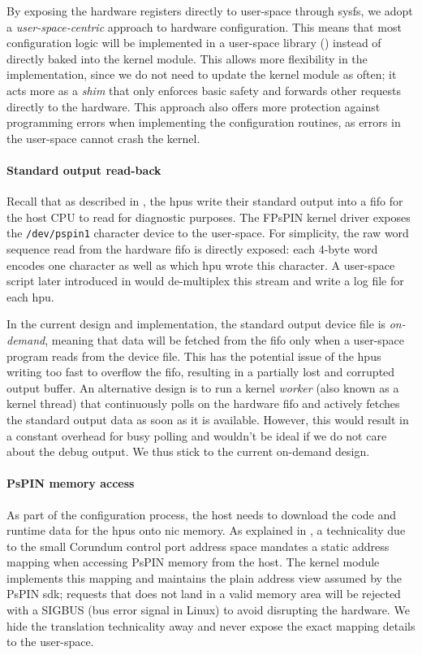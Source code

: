By exposing the hardware registers directly to user-space through sysfs, we adopt a \emph{user-space-centric} approach to hardware configuration.  This means that most configuration logic will be implemented in a user-space library () instead of directly baked into the kernel module.  This allows more flexibility in the implementation, since we do not need to update the kernel module as often; it acts more as a \emph{shim} that only enforces basic safety and forwards other requests directly to the hardware.  This approach also offers more protection against programming errors when implementing the configuration routines, as errors in the user-space cannot crash the kernel.

\paragraph{Standard output read-back} Recall that as described in , the \ac{hpu}s write their standard output into a \ac{fifo} for the host CPU to read for diagnostic purposes.  The FPsPIN kernel driver exposes the \texttt{/dev/pspin1} character device to the user-space.  For simplicity, the raw word sequence read from the hardware \ac{fifo} is directly exposed: each 4-byte word encodes one character as well as which \ac{hpu} wrote this character.  A user-space script later introduced in  would de-multiplex this stream and write a log file for each \ac{hpu}.

In the current design and implementation, the standard output device file is \emph{on-demand}, meaning that data will be fetched from the \ac{fifo} only when a user-space program reads from the device file.  This has the potential issue of the \ac{hpu}s writing too fast to overflow the \ac{fifo}, resulting in a partially lost and corrupted output buffer.  An alternative design is to run a kernel \emph{worker} (also known as a kernel thread) that continuously polls on the hardware \ac{fifo} and actively fetches the standard output data as soon as it is available.  However, this would result in a constant overhead for busy polling and wouldn't be ideal if we do not care about the debug output.  We thus stick to the current on-demand design.

\paragraph{PsPIN memory access} As part of the configuration process, the host needs to download the code and runtime data for the \ac{hpu}s onto \ac{nic} memory.  As explained in , a technicality due to the small Corundum control port address space mandates a static address mapping when accessing PsPIN memory from the host.  The kernel module implements this mapping and maintains the plain address view assumed by the PsPIN \ac{sdk}; requests that does not land in a valid memory area will be rejected with a SIGBUS (bus error signal in Linux) to avoid disrupting the hardware.  We hide the translation technicality away and never expose the exact mapping details to the user-space.

